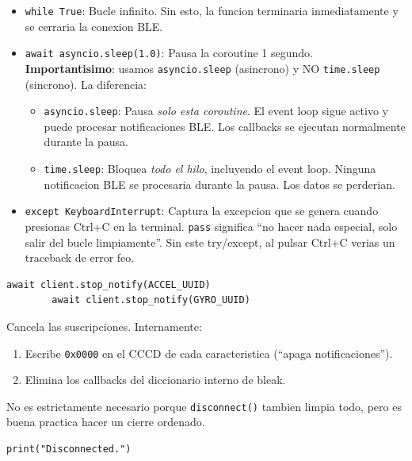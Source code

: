 \documentclass[11pt,a4paper]{article}
\begin{document}
\begin{itemize}
    \item \texttt{while True}: Bucle infinito. Sin esto, la funcion
          terminaria inmediatamente y se cerraria la conexion BLE.

    \item \texttt{await asyncio.sleep(1.0)}: Pausa la coroutine 1
          segundo. \textbf{Importantisimo}: usamos
          \texttt{asyncio.sleep} (asincrono) y NO \texttt{time.sleep}
          (sincrono). La diferencia:

    \begin{itemize}
        \item \texttt{asyncio.sleep}: Pausa \emph{solo esta
              coroutine}. El event loop sigue activo y puede
              procesar notificaciones BLE. Los callbacks se ejecutan
              normalmente durante la pausa.
        \item \texttt{time.sleep}: Bloquea \emph{todo el hilo},
              incluyendo el event loop. Ninguna notificacion BLE se
              procesaria durante la pausa. Los datos se perderian.
    \end{itemize}

    \item \texttt{except KeyboardInterrupt}: Captura la excepcion
          que se genera cuando presionas Ctrl+C en la terminal.
          \texttt{pass} significa ``no hacer nada especial, solo
          salir del bucle limpiamente''. Sin este try/except, al
          pulsar Ctrl+C verias un traceback de error feo.
\end{itemize}

\begin{lstlisting}[style=python]
        await client.stop_notify(ACCEL_UUID)
        await client.stop_notify(GYRO_UUID)
\end{lstlisting}

Cancela las suscripciones. Internamente:
\begin{enumerate}
    \item Escribe \texttt{0x0000} en el CCCD de cada caracteristica
          (``apaga notificaciones'').
    \item Elimina los callbacks del diccionario interno de bleak.
\end{enumerate}

No es estrictamente necesario porque \texttt{disconnect()} tambien
limpia todo, pero es buena practica hacer un cierre ordenado.

\begin{lstlisting}[style=python]
    print("Disconnected.")
\end{lstlisting}
\end{document}
